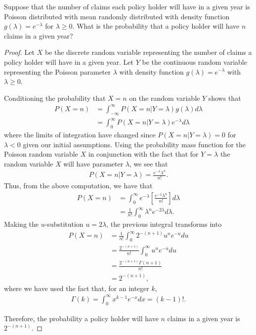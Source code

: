 \begin{problem}{1}
  Suppose that the number of claims each policy holder will have in a given year is
  Poisson distributed with mean randomly distributed with density function $g(\lambda) = e^{-\lambda}$
  for $\lambda \geq 0$.
  What is the probability that a policy holder will have $n$ claims in a given year?
\end{problem}

\begin{proof}
  Let $X$ be the discrete random variable representing the number of claims
  a policy holder will have in a given year. Let $Y$ be the continuous random
  variable representing the Poisson parameter $\lambda$ with density function
  $g(\lambda) = e^{-\lambda}$ with $\lambda \geq 0$.

  Conditioning the probability that $X = n$ on the random variable $Y$ shows
  that
  \begin{align*}
    P(X = n) &= \int_{-\infty}^{\infty} P(X=n | Y=\lambda) g(\lambda) d \lambda \\
    &= \int_{0}^{\infty} P(X=n | Y=\lambda) e^{-\lambda} d \lambda
  \end{align*}
  where the limits of integration have changed since $P(X=n | Y=\lambda) = 0$ for
  $\lambda < 0$ given our initial assumptions. Using the probability mass function
  for the Poisson random variable $X$ in conjunction with the fact that for
  $Y=\lambda$ the random variable $X$ will have parameter $\lambda$,
  we see that
  \begin{align*}
    P(X=n | Y=\lambda) = \frac{e^{-\lambda}\lambda^n}{n!}.
  \end{align*}
  Thus, from the above computation, we have that
  \begin{align*}
    P(X = n) &= \int_{0}^{\infty}  e^{-\lambda} \left[\frac{e^{-\lambda}\lambda^n}{n!}\right] d \lambda \\
    &= \frac{1}{n!}\int_{0}^{\infty} \lambda^n e^{-2\lambda} d\lambda.
  \end{align*}
  Making the $u$-substitution $u=2\lambda$, the previous integral transforms into
  \begin{align*}
    P(X = n) &= \frac{1}{n!}\int_{0}^{\infty} 2^{-(n+1)}u^{n} e^{-u} du \\
    &= \frac{2^{-(n+1)}}{n!}\int_{0}^{\infty} u^{n} e^{-u} du \\
    &= \frac{2^{-(n+1)}\Gamma(n+1)}{n!} \\
    &= 2^{-(n+1)},
 \end{align*}
 where we have used the fact that, for an integer $k$,
 \begin{align*}
   \Gamma(k) = \int_0^\infty x^{k-1} e^{-x} dx = (k-1)!.
 \end{align*}

 Therefore, the probability a policy holder will have $n$ claims in a given year is $2^{-(n+1)}$.
\end{proof}
\newpage
